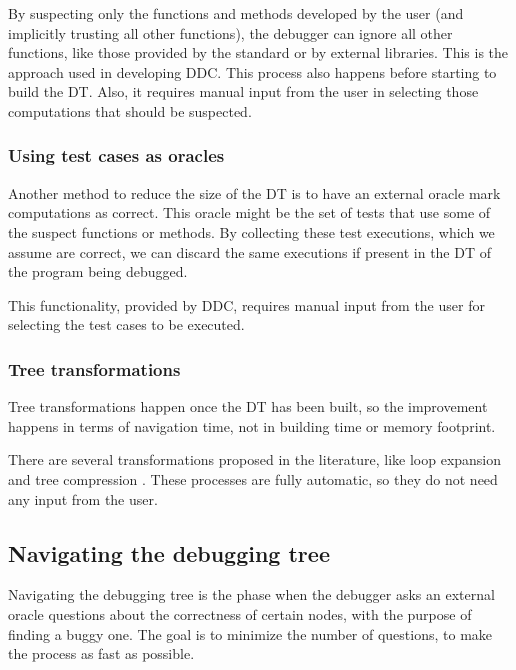 By suspecting only the functions and methods developed by the user (and implicitly trusting all other functions), the debugger can ignore all other functions, like those provided by the standard or by external libraries.
This is the approach used in developing DDC.
This process also happens before starting to build the DT. Also, it requires manual input from the user in selecting those computations that should be suspected.

\subsubsection{Using test cases as oracles}

Another method to reduce the size of the DT is to have an external oracle mark computations as correct.
This oracle might be the set of tests that use some of the suspect functions or methods. By collecting these test executions, which we assume are correct, we can discard the same executions if present in the DT of the program being debugged.

This functionality, provided by DDC, requires manual input from the user for selecting the test cases to be executed.


\subsubsection{Tree transformations}
Tree transformations happen once the DT has been built, so the improvement happens in terms of navigation time, not in building time or memory footprint.

There are several transformations proposed in the literature, like loop expansion and tree compression \cite{LoopExpansionTreeCompression}.
These processes are fully automatic, so they do not need any input from the user.

\subsection{Navigating the debugging tree}
Navigating the debugging tree is the phase when the debugger asks an external oracle questions about the correctness of certain nodes, with the purpose of finding a buggy one.
The goal is to minimize the number of questions, to make the process as fast as possible.
